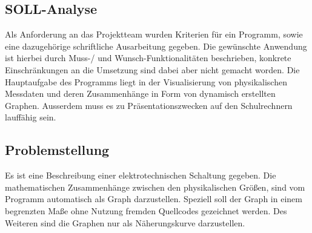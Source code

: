 \documentclass{article}
\begin{document}
\subsection{SOLL-Analyse}

    Als Anforderung an das Projektteam wurden Kriterien für ein Programm, sowie eine dazugehörige schriftliche Ausarbeitung gegeben.
     Die gewünschte Anwendung ist hierbei durch Muss-/ und Wunsch-Funktionalitäten beschrieben, konkrete Einschränkungen an die Umsetzung sind dabei aber nicht gemacht worden.
     Die Hauptaufgabe des Programms liegt in der Visualisierung von physikalischen Messdaten und deren Zusammenhänge in Form von dynamisch erstellten Graphen.
     Ausserdem muss es zu Präsentationszwecken auf den Schulrechnern lauffähig sein.

\subsection{Problemstellung}

    Es ist eine Beschreibung einer elektrotechnischen Schaltung gegeben. Die mathematischen Zusammenhänge zwischen den physikalischen Größen, sind vom Programm automatisch als Graph darzustellen. Speziell soll der Graph in einem begrenzten Maße ohne Nutzung fremden Quellcodes gezeichnet werden. Des Weiteren sind die Graphen nur als Näherungskurve darzustellen.
\end{document}
